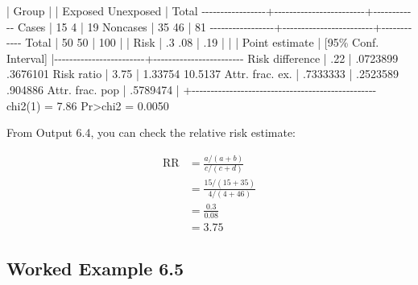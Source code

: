 \documentclass[
]{memoir}
\newenvironment{Shaded}{\begin{snugshade}}{\end{snugshade}}
\newcommand{\NormalTok}[1]{#1}
\begin{document}
\begin{Shaded}
\begin{Highlighting}[]
\NormalTok{                 | Group                  |}
\NormalTok{                 |   Exposed   Unexposed  |      Total}
\NormalTok{{-}{-}{-}{-}{-}{-}{-}{-}{-}{-}{-}{-}{-}{-}{-}{-}{-}+{-}{-}{-}{-}{-}{-}{-}{-}{-}{-}{-}{-}{-}{-}{-}{-}{-}{-}{-}{-}{-}{-}{-}{-}+{-}{-}{-}{-}{-}{-}{-}{-}{-}{-}{-}{-}}
\NormalTok{           Cases |        15           4  |         19}
\NormalTok{        Noncases |        35          46  |         81}
\NormalTok{{-}{-}{-}{-}{-}{-}{-}{-}{-}{-}{-}{-}{-}{-}{-}{-}{-}+{-}{-}{-}{-}{-}{-}{-}{-}{-}{-}{-}{-}{-}{-}{-}{-}{-}{-}{-}{-}{-}{-}{-}{-}+{-}{-}{-}{-}{-}{-}{-}{-}{-}{-}{-}{-}}
\NormalTok{           Total |        50          50  |        100}
\NormalTok{                 |                        |}
\NormalTok{            Risk |        .3         .08  |        .19}
\NormalTok{                 |                        |}
\NormalTok{                 |      Point estimate    |    [95\% Conf. Interval]}
\NormalTok{                 |{-}{-}{-}{-}{-}{-}{-}{-}{-}{-}{-}{-}{-}{-}{-}{-}{-}{-}{-}{-}{-}{-}{-}{-}+{-}{-}{-}{-}{-}{-}{-}{-}{-}{-}{-}{-}{-}{-}{-}{-}{-}{-}{-}{-}{-}{-}{-}{-}}
\NormalTok{ Risk difference |              .22       |    .0723899    .3676101 }
\NormalTok{      Risk ratio |             3.75       |     1.33754     10.5137 }
\NormalTok{ Attr. frac. ex. |         .7333333       |    .2523589     .904886 }
\NormalTok{ Attr. frac. pop |         .5789474       |}
\NormalTok{                 +{-}{-}{-}{-}{-}{-}{-}{-}{-}{-}{-}{-}{-}{-}{-}{-}{-}{-}{-}{-}{-}{-}{-}{-}{-}{-}{-}{-}{-}{-}{-}{-}{-}{-}{-}{-}{-}{-}{-}{-}{-}{-}{-}{-}{-}{-}{-}{-}{-}}
\NormalTok{                               chi2(1) =     7.86  Pr\textgreater{}chi2 = 0.0050}
\end{Highlighting}
\end{Shaded}

From Output 6.4, you can check the relative risk estimate:

\[
\begin{aligned}
\text{RR} &= \frac{a / (a+b)}{c / (c+d)} \\
  &= \frac{15 / (15+35)}{4 / (4+46)} \\
  &= \frac{0.3}{0.08} \\
  &= 3.75
\end{aligned}
\]

\hypertarget{worked-example-6.5}{%
\subsection{Worked Example 6.5}\label{worked-example-6.5}}
\end{document}
